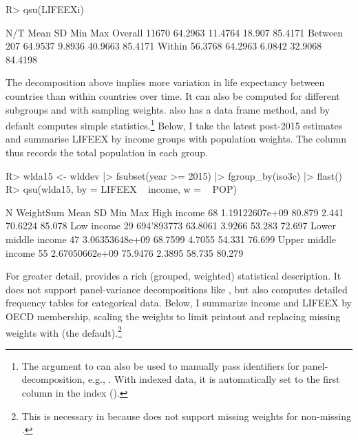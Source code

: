 \documentclass[nojss]{jss} %
\newcommand{\fct}[1]{\code{#1()}}
\begin{document}
%
\begin{Schunk}
\begin{Sinput}
R> qsu(LIFEEXi)
\end{Sinput}
\begin{Soutput}
             N/T     Mean       SD      Min      Max
Overall    11670  64.2963  11.4764   18.907  85.4171
Between      207  64.9537   9.8936  40.9663  85.4171
Within   56.3768  64.2963   6.0842  32.9068  84.4198
\end{Soutput}
\end{Schunk}
%
The decomposition above implies more variation in life expectancy between countries than within countries over time. It can also be computed for different subgroups and with sampling weights. \fct{qsu} also has a data frame method, and by default computes simple statistics.\footnote{The  argument to \fct{qsu} can also be used to manually pass identifiers for panel-decomposition, e.g., . With indexed data, it is automatically set to the first column in the index ().} Below, I take the latest post-2015 estimates and summarise LIFEEX by income groups with population weights. The  column thus records the total population in each group.
%
\begin{Schunk}
\begin{Sinput}
R> wlda15 <- wlddev |> fsubset(year >= 2015) |> fgroup_by(iso3c) |> flast()
R> qsu(wlda15, by = LIFEEX ~ income, w = ~ POP)
\end{Sinput}
\begin{Soutput}
                      N       WeightSum     Mean      SD      Min     Max
High income          68  1.19122607e+09   80.879   2.441  70.6224  85.078
Low income           29      694'893773  63.8061  3.9266   53.283  72.697
Lower middle income  47  3.06353648e+09  68.7599  4.7055   54.331  76.699
Upper middle income  55  2.67050662e+09  75.9476  2.3895   58.735  80.279
\end{Soutput}
\end{Schunk}
%
For greater detail, \fct{descr} provides a rich (grouped, weighted) statistical description. It does not support panel-variance decompositions like \fct{qsu}, but also computes detailed frequency tables for categorical data. Below, I summarize income and LIFEEX by OECD membership, scaling the weights to limit printout and replacing missing weights with  (the default).\footnote{This is necessary in \fct{descr} because \fct{fquantile} does not support missing weights for non-missing .\vspace{-5mm}}
\end{document}
